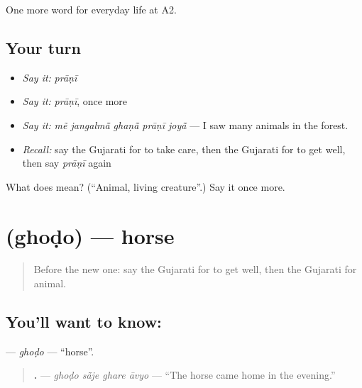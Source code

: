 \begin{grammarlens}[title={What you've built}]
One more word for everyday life at A2.
\end{grammarlens}

\subsection*{Your turn}
\begin{itemize}
\raggedright
  \item \emph{Say it:} \emph{prāṇī}
  \item \emph{Say it:} \emph{prāṇī}, once more
  \item \emph{Say it:} \emph{mẽ jangalmā̃ ghaṇā̃ prāṇī joyā̃} — I saw many animals in the forest.
  \item \emph{Recall:} say the Gujarati for to take care, then the Gujarati for to get well, then say \emph{prāṇī} again
\end{itemize}

\begin{tcolorbox}[breakable,colback=teal!4,colframe=teal!35!black,title={Before you move on}]
What does  mean? (\textquotedblleft{}Animal, living creature\textquotedblright{}.) Say it once more.
\end{tcolorbox}
\section[\texorpdfstring{\gu{ઘોડો} (ghoḍo)}{ઘોડો (ghoḍo)}]{ (ghoḍo) — horse}

\label{lesson:GU-C233-ghodo}



\begin{quote}
Before the new one: say the Gujarati for to get well, then the Gujarati for animal.
\end{quote}

\subsection*{You'll want to know: }
\textbf{} — \emph{ghoḍo} — \textquotedblleft{}horse\textquotedblright{}.

\begin{quote}
\textbf{   .} — \emph{ghoḍo sā̃je ghare āvyo} — \textquotedblleft{}The horse came home in the evening.\textquotedblright{}
\end{quote}

